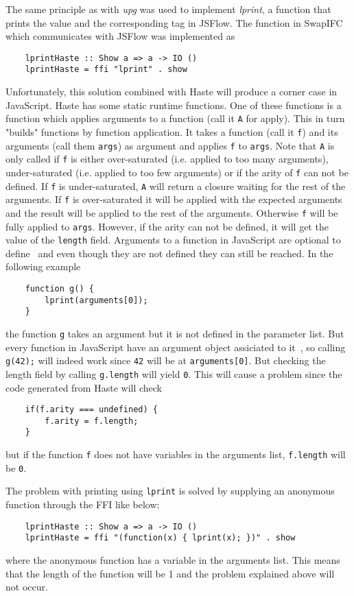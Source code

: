 The same principle as with \emph{upg} was used to implement \emph{lprint}, a function that prints the value and the corresponding tag in JSFlow. The function in SwapIFC which communicates with JSFlow was implemented as
\begin{verbatim}
    lprintHaste :: Show a => a -> IO ()
    lprintHaste = ffi "lprint" . show
\end{verbatim}
Unfortunately, this solution combined with Haste will produce a corner case in JavaScript. Haste has some static runtime functions. One of these functions is a function which applies arguments to a function (call it {\tt A} for apply). This in turn "builds" functions by function application. It takes a function (call it {\tt f}) and its arguments (call them {\tt args}) as argument and applies {\tt f} to {\tt args}. Note that {\tt A} is only called if {\tt f} is either over-saturated (i.e. applied to too many arguments), under-saturated (i.e. applied to too few arguments) or if the arity of {\tt f} can not be defined. If {\tt f} is under-saturated, {\tt A} will return a closure waiting for the rest of the arguments. If {\tt f} is over-saturated it will be applied with the expected arguments and the result will be applied to the rest of the arguments. Otherwise {\tt f} will be fully applied to {\tt args}. However, if the arity can not be defined, it will get the value of the {\tt length} field. Arguments to a function in JavaScript are optional to define~\cite{js-function} and even though they are not defined they can still be reached. In the following example
\begin{verbatim}
    function g() {
        lprint(arguments[0]);
    }
\end{verbatim}
the function {\tt g} takes an argument but it is not defined in the parameter list. But every function in JavaScript have an argument object assiciated to it~\cite{js-arguments}, so calling {\tt g(42);} will indeed work since {\tt 42} will be at {\tt arguments[0]}. But checking the length field by calling {\tt g.length} will yield {\tt 0}. This will cause a problem since the code generated from Haste will check
\begin{verbatim}
    if(f.arity === undefined) {
        f.arity = f.length;
    }
\end{verbatim}
but if the function {\tt f} does not have variables in the arguments list, {\tt f.length} will be {\tt 0}.

The problem with printing using {\tt lprint} is solved by supplying an anonymous function through the FFI like below:
\begin{verbatim}
    lprintHaste :: Show a => a -> IO ()
    lprintHaste = ffi "(function(x) { lprint(x); })" . show
\end{verbatim}
where the anonymous function has a variable in the arguments list. This means that the length of the function will be 1 and the problem explained above will not occur. 

